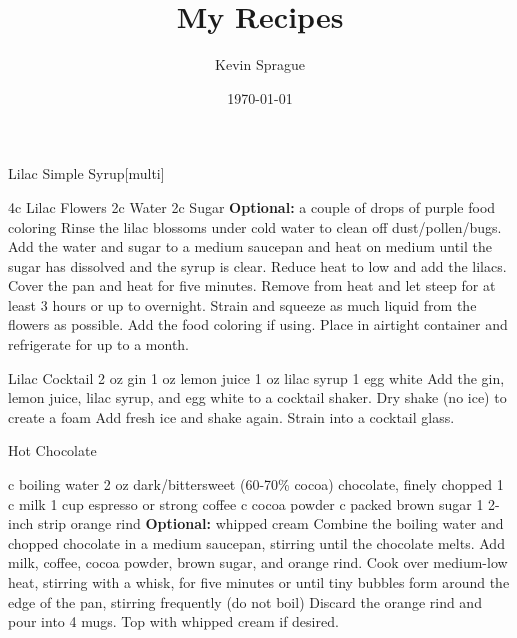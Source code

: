 \documentclass[12pt]{cookbook}
\title{My Recipes}
\author{Kevin Sprague}
\date{\today}
\begin{document}
\begin{recipe}{Lilac Simple Syrup}[multi]

\ingredients
	{4c Lilac Flowers}
	{2c Water}
	{2c Sugar}
	{\textbf{Optional:} a couple of drops of purple food coloring}
\stopingredients
\preparation
	{Rinse the lilac blossoms under cold water to clean off dust/pollen/bugs.}
	{Add the water and sugar to a medium saucepan and heat on medium until the sugar has dissolved and the syrup is clear.}
	{Reduce heat to low and add the lilacs. Cover the pan and heat for five minutes.}
	{Remove from heat and let steep for at least 3 hours or up to overnight.}
	{Strain and squeeze as much liquid from the flowers as possible.}
	{Add the food coloring if using.}
	{Place in airtight container and refrigerate for up to a month.}
\stopprep
\end{recipe}
\begin{recipe}{Lilac Cocktail}
\ingredients
    {2 oz gin}
    {1 oz lemon juice}
    {1 oz lilac syrup}
    {1 egg white}
\stopingredients
\preparation
    {Add the gin, lemon juice, lilac syrup, and egg white to a cocktail shaker. Dry shake (no ice) to create a foam}
    {Add fresh ice and shake again.}
    {Strain into a cocktail glass.}
\stopprep
\end{recipe}
\begin{recipe}{Hot Chocolate}
\begin{center}
\end{center}
\ingredients
    { c boiling water}
    {2 oz dark/bittersweet (60-70\% cocoa) chocolate, finely chopped}
    {1  c milk}
    {1 cup espresso or strong coffee}
    { c cocoa powder}
    { c packed brown sugar}
    {1 2-inch strip orange rind}
    {\textbf{Optional:} whipped cream}
\stopingredients
\preparation
    {Combine the boiling water and chopped chocolate in a medium saucepan, stirring until the chocolate melts.}
    {Add milk, coffee, cocoa powder, brown sugar, and orange rind. Cook over medium-low heat, stirring with a whisk, for five minutes or until tiny bubbles form around the edge of the pan, stirring frequently (do not boil)}
    {Discard the orange rind and pour into 4 mugs.}
    {Top with whipped cream if desired.}
\stopprep
\end{recipe}
\end{document}
